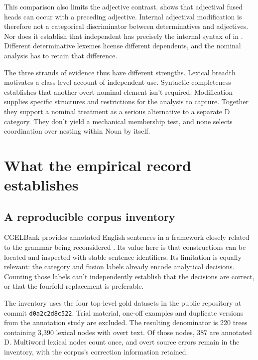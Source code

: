 \documentclass[12pt]{article}
\begin{document}
This comparison also limits the adjective contrast.  shows that adjectival fused heads can occur with a preceding adjective. Internal adjectival modification is therefore not a categorical discriminator between determinatives and adjectives. Nor does it establish that independent  has precisely the internal syntax of  in . Different determinative lexemes license different dependents, and the nominal analysis has to retain that difference.

The three strands of evidence thus have different strengths. Lexical breadth motivates a class-level account of independent use. Syntactic completeness establishes that another overt nominal element isn't required. Modification supplies specific structures and restrictions for the analysis to capture. Together they support a nominal treatment as a serious alternative to a separate D category. They don't yield a mechanical membership test, and none selects coordination over nesting within Noun by itself.

\section{What the empirical record establishes}\label{sec:empirical}

\subsection{A reproducible corpus inventory}

CGELBank provides annotated English sentences in a framework closely related to the grammar being reconsidered \citep{reynolds2023unified}. Its value here is that constructions can be located and inspected with stable sentence identifiers. Its limitation is equally relevant: the category and fusion labels already encode analytical decisions. Counting those labels can't independently establish that the decisions are correct, or that the fourfold replacement is preferable.

The inventory uses the four top-level gold datasets in the public repository at commit \texttt{d0a2c2d8c522}. Trial material, one-off examples and duplicate versions from the annotation study are excluded. The resulting denominator is 220 trees containing 3,390 lexical nodes with overt text. Of those nodes, 387 are annotated D. Multiword lexical nodes count once, and overt source errors remain in the inventory, with the corpus's correction information retained.
\end{document}
